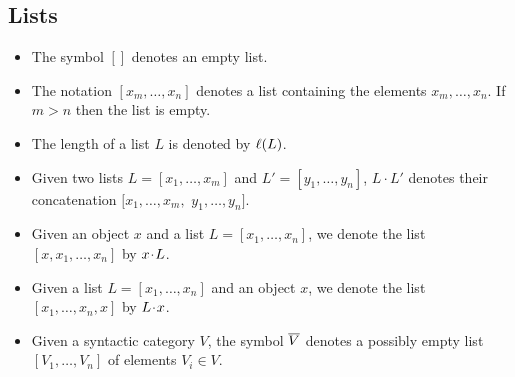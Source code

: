 \subsection{Lists}
\label{sec:notation-lists}
\begin{itemize}
\item  The symbol $[]$ denotes an empty list.
\item The notation $[x_m, \ldots, x_n]$ denotes a list containing the elements
  $x_m, \ldots, x_n$.  If $m>n$ then the list is empty.
\item The length of a list $L$ is denoted by $\operatorname{\ell}(L)$.
\item Given two lists $L = [x_1,\ldots, x_m]$ and $L' = [y_1,\ldots, y_n]$, $L\cdot L'$ 
denotes their concatenation  $[x_1,\ldots, x_m,$ $y_1, \ldots, y_n]$.  %
\item Given an object $x$ and a list $L = [x_1,\ldots, x_n]$,
we denote the list $[x,x_1,\ldots, x_n]$ by $x \mathbin{\!\cdot\!} L$.
\item Given a list $L = [x_1, \ldots, x_n]$ and an object $x$,
we denote the list $[x_1, \ldots, x_n, x]$ by $L \mathbin{\!\cdot\!} x$.
\item Given a syntactic category $V$, the symbol $\overline{V}$ denotes a
  possibly empty list $[V_1,\ldots, V_n]$ of elements $V_i \in V$.
\end{itemize}%
%
%
%
%
%
